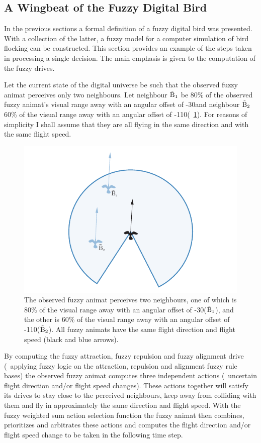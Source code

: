 \subsection{A Wingbeat of the Fuzzy Digital Bird}
\label{sec:fuzzyAnimat:decision}
In the previous sections a formal definition of a fuzzy digital bird was presented. With a collection of the latter, a fuzzy model for a computer simulation of bird flocking can be constructed. This section provides an example of the steps taken in processing a single decision. The main emphasis is given to the computation of the fuzzy drives.

Let the current state of the digital universe be such that the observed fuzzy animat perceives only two neighbours. Let neighbour ${\tilde{\mathrm{B}}}_1$ be 80\% of the observed fuzzy animat's visual range away with an angular offset of -30\deg and neighbour ${\tilde{\mathrm{B}}}_2$ 60\% of the visual range away with an angular offset of -110\deg (\fig~\ref{fig:attraction:FLS:ini}). For reasons of simplicity I shall assume that they are all flying in the same direction and with the same flight speed. 

\begin{figure}%
\includegraphics{fig[attractionFLSini]}
\caption{The observed fuzzy animat perceives two neighbours, one of which is 80\% of the visual range away with an angular offset of -30\deg (${\tilde{\mathrm{B}}}_1$), and the other is 60\% of the visual range away with an angular offset of -110\deg (${\tilde{\mathrm{B}}}_2$). All fuzzy animats have the same flight direction and flight speed (black and blue arrows).}
\label{fig:attraction:FLS:ini}
\end{figure}

By computing the fuzzy attraction, fuzzy repulsion and fuzzy alignment drive (\ie\ applying fuzzy logic on the attraction, repulsion and alignment fuzzy rule bases) the observed fuzzy animat computes three independent actions (\ie\ uncertain flight direction and/or flight speed changes). These actions together will satisfy its drives to stay close to the perceived neighbours, keep away from colliding with them and fly in approximately the same direction and flight speed. With the fuzzy weighted sum action selection function the fuzzy animat then combines, prioritizes and arbitrates these actions and computes the flight direction and/or flight speed change to be taken in the following time step. 

